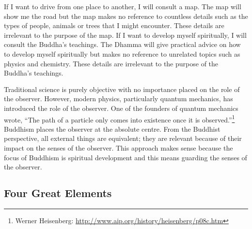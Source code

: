 If I want to drive from one place to another, I will consult a map. The map will show me the road but the map makes no reference to countless details such as the types of people, animals or trees that I might encounter. These details are irrelevant to the purpose of the map. If I want to develop myself spiritually, I will consult the Buddha’s teachings. The Dhamma will give practical advice on how to develop myself spiritually but makes no reference to unrelated topics such as physics and chemistry. These details are irrelevant to the purpose of the Buddha’s teachings.

Traditional science is purely objective with no importance placed on the role of the observer. However, modern physics, particularly quantum mechanics, has introduced the role of the observer. One of the founders of quantum mechanics wrote, “The path of a particle only comes into existence once it is observed.”\footnote{Werner Heisenberg: \url{http://www.aip.org/history/heisenberg/p08c.htm}} Buddhism places the observer at the absolute centre. From the Buddhist perspective, all external things are equivalent; they are relevant because of their impact on the senses of the observer. This approach makes sense because the focus of Buddhism is spiritual development and this means guarding the senses of the observer.

\subsection*{Four Great Elements}

